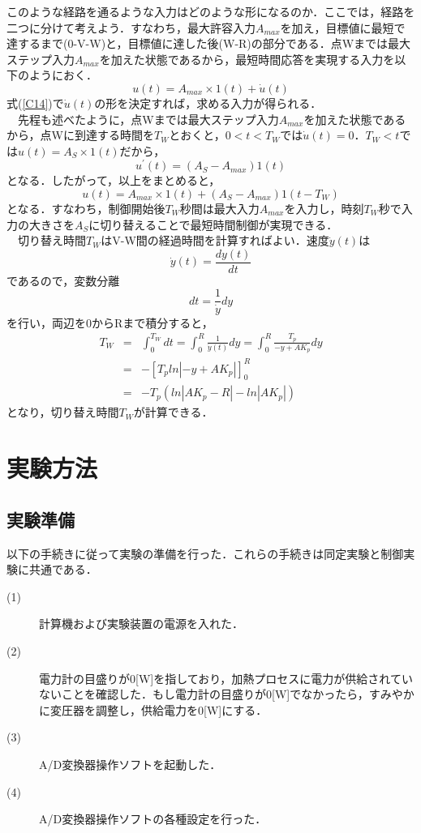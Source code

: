 \documentclass[12pt]{jsarticle}
\begin{document}
  このような経路を通るような入力はどのような形になるのか．ここでは，経路を二つに分けて考えよう．すなわち，最大許容入力$A_{max}$を加え，目標値に最短で達するまで(0-V-W)と，目標値に達した後(W-R)の部分である．点Wまでは最大ステップ入力$A_{max}$を加えた状態であるから，最短時間応答を実現する入力を以下のようにおく．\\
\begin{equation}
  \label{C14}
  u(t)=A_{max}×1(t) + \dot{u}(t)
\end{equation}
式(\ref{C14})で$\dot{u}(t)$の形を決定すれば，求める入力が得られる．\\
　先程も述べたように，点Wまでは最大ステップ入力$A_{max}$を加えた状態であるから，点Wに到達する時間を$T_W$とおくと，$0<t<T_W$では$\dot{u}(t)=0$．$T_W<t$では$u(t)=A_S×1(t)$だから，
\begin{equation}
  \label{C15}
  u^{\prime}(t)=(A_S-A_{max})1(t)
\end{equation}
となる．したがって，以上をまとめると，
\begin{equation}
  \label{C16}
  u(t)=A_{max}×1(t)+(A_S-A_{max})1(t-T_W)
\end{equation}
となる．すなわち，制御開始後$T_W$秒間は最大入力$A_{max}$を入力し，時刻$T_W$秒で入力の大きさを$A_S$に切り替えることで最短時間制御が実現できる．\\
　切り替え時間$T_W$はV-W間の経過時間を計算すればよい．速度$\dot{y}(t)$は
\begin{equation}
  \label{C17}
  \dot{y}(t)=\frac{dy(t)}{dt}
\end{equation}
であるので，変数分離
\begin{equation}
  \label{C18}
  dt = \frac{1}{\dot{y}}dy
\end{equation}
を行い，両辺を0からRまで積分すると，
\begin{eqnarray}
  \label{C19}
  T_W & = & \int_0^{T_W} dt = \int_0^R \frac{1}{\dot{y}(t)} dy = \int_0^R \frac{T_p}{-y+AK_p} dy\\
  & = & -[T_p ln|-y+AK_p|]^R_0\\
  & = & -T_p(ln|AK_p-R|-ln|AK_p|)
\end{eqnarray}
となり，切り替え時間$T_W$が計算できる．
\section{実験方法}
\subsection{実験準備}
以下の手続きに従って実験の準備を行った．これらの手続きは同定実験と制御実験に共通である．
\begin{description}
  \item[(1)]計算機および実験装置の電源を入れた．
  \item[(2)]電力計の目盛りが0[W]を指しており，加熱プロセスに電力が供給されていないことを確認した．もし電力計の目盛りが0[W]でなかったら，すみやかに変圧器を調整し，供給電力を0[W]にする．
  \item[(3)]A/D変換器操作ソフトを起動した．
  \item[(4)]A/D変換器操作ソフトの各種設定を行った．
\end{description}
\end{document}
